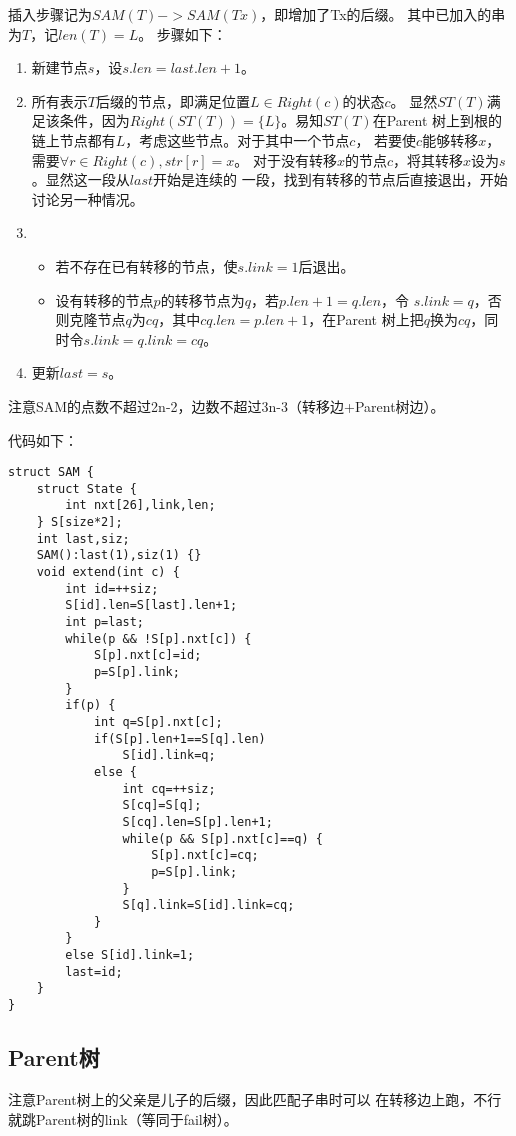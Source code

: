 插入步骤记为$SAM(T)->SAM(Tx)$，即增加了Tx的后缀。
其中已加入的串为$T$，记$len(T)=L$。
步骤如下：
\begin{enumerate}
    \item 新建节点$s$，设$s.len=last.len+1$。
    \item 所有表示$T$后缀的节点，即满足位置$L\in Right(c)$的状态$c$。
    显然$ST(T)$满足该条件，因为$Right(ST(T))=\{L\}$。易知$ST(T)$在Parent
    树上到根的链上节点都有$L$，考虑这些节点。对于其中一个节点$c$，
    若要使$c$能够转移$x$，需要$\forall{r\in Right(c)},str[r]=x$。
    对于没有转移$x$的节点$c$，将其转移$x$设为$s$。显然这一段从$last$开始是连续的
    一段，找到有转移的节点后直接退出，开始讨论另一种情况。
    \item \begin{itemize}
        \item 若不存在已有转移的节点，使$s.link=1$后退出。
        \item 设有转移的节点$p$的转移节点为$q$，若$p.len+1=q.len$，令
        $s.link=q$，否则克隆节点$q$为$cq$，其中$cq.len=p.len+1$，在Parent
        树上把$q$换为$cq$，同时令$s.link=q.link=cq$。
    \end{itemize}
    \item 更新$last=s$。
\end{enumerate}
注意SAM的点数不超过2n-2，边数不超过3n-3（转移边+Parent树边）。

代码如下：
\begin{lstlisting}
struct SAM {
    struct State {
        int nxt[26],link,len;
    } S[size*2];
    int last,siz;
    SAM():last(1),siz(1) {}
    void extend(int c) {
        int id=++siz;
        S[id].len=S[last].len+1;
        int p=last;
        while(p && !S[p].nxt[c]) {
            S[p].nxt[c]=id;
            p=S[p].link;
        }
        if(p) {
            int q=S[p].nxt[c];
            if(S[p].len+1==S[q].len)
                S[id].link=q;
            else {
                int cq=++siz;
                S[cq]=S[q];
                S[cq].len=S[p].len+1;
                while(p && S[p].nxt[c]==q) {
                    S[p].nxt[c]=cq;
                    p=S[p].link;
                }
                S[q].link=S[id].link=cq;
            }
        }
        else S[id].link=1;
        last=id;
    }
}
\end{lstlisting}
\subsection{Parent树}
注意Parent树上的父亲是儿子的后缀，因此匹配子串时可以
在转移边上跑，不行就跳Parent树的link（等同于fail树）。
